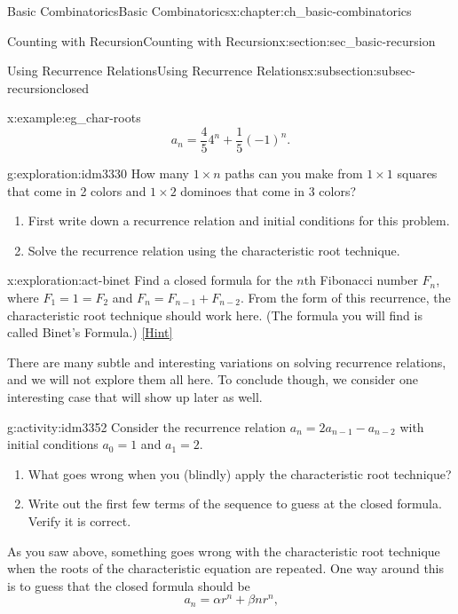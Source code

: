 \documentclass[oneside,10pt,]{book}
\numberwithin{equation}{chapter}
\begin{document}
\begin{chapterptx}{Basic Combinatorics}{}{Basic Combinatorics}{}{}{x:chapter:ch_basic-combinatorics}
\begin{sectionptx}{Counting with Recursion}{}{Counting with Recursion}{}{}{x:section:sec_basic-recursion}
\begin{subsectionptx}{Using Recurrence Relations}{}{Using Recurrence Relations}{}{}{x:subsection:subsec-recursionclosed}
\begin{example}{}{x:example:eg_char-roots}
\begin{equation*}
a_n = \frac{4}{5} 4^n + \frac{1}{5} (-1)^n\text{.}
\end{equation*}
%
\end{example}
\begin{exploration}{}{g:exploration:idm3330}%
How many \(1\times n\) paths can you make from \(1\times 1\) squares that come in 2 colors and \(1\times 2\) dominoes that come in 3 colors?%
\begin{enumerate}[font=\bfseries,label=(\alph*),ref=\alph*]
\item{}First write down a recurrence relation and initial conditions for this problem.%
\item{}Solve the recurrence relation using the characteristic root technique.%
\end{enumerate}
\end{exploration}
\begin{exploration}{}{x:exploration:act-binet}%
Find a closed formula for the \(n\)th Fibonacci number \(F_n\), where \(F_1 = 1 = F_2\) and \(F_n = F_{n-1} + F_{n-2}\).  From the form of this recurrence, the characteristic root technique should work here.  (The formula you will find is called Binet's Formula.)%
\space\hspace*{0pt}\hfill{\tiny\hyperlink{g:hint:idm3347-back}{[Hint]}}\end{exploration}
There are many subtle and interesting variations on solving recurrence relations, and we will not explore them all here.  To conclude though, we consider one interesting case that will show up later as well.%
\begin{activity}{}{g:activity:idm3352}%
Consider the recurrence relation \(a_n = 2a_{n-1} - a_{n-2}\) with initial conditions \(a_0 = 1\) and \(a_1 = 2\).%
\begin{enumerate}[font=\bfseries,label=(\alph*),ref=\alph*]
\item{}What goes wrong when you (blindly) apply the characteristic root technique?%
\item{}Write out the first few terms of the sequence to guess at the closed formula.  Verify it is correct.%
\end{enumerate}
\end{activity}
As you saw above, something goes wrong with the characteristic root technique when the roots of the characteristic equation are repeated.  One way around this is to guess that the closed formula should be%
\begin{equation*}
a_n = \alpha r^n + \beta nr^n\text{,}
\end{equation*}

\end{subsectionptx}
\end{sectionptx}
\end{chapterptx}
\end{document}
